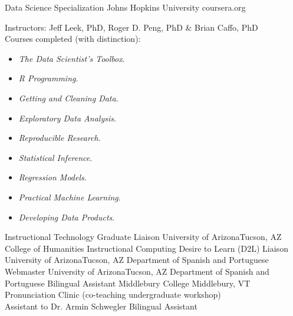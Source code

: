 \documentclass[11pt,letterpaper]{moderncv}
\begin{document}
        {Data Science Specialization}
        {Johns Hopkins University}
        {coursera.org}
        {}
        {Instructors: Jeff Leek, PhD, Roger D. Peng, PhD \& Brian Caffo, PhD\\
        Courses completed (with distinction):
        \begin{itemize}
          \item[] \small \emph{The Data Scientist’s Toolbox}.\vspace{-.03in}
          \item[] \small \emph{R Programming}.\vspace{-.03in}
          \item[] \small \emph{Getting and Cleaning Data}.\vspace{-.03in}
          \item[] \small \emph{Exploratory Data Analysis}.\vspace{-.03in}
          \item[] \small \emph{Reproducible Research}.\vspace{-.03in}
          \item[] \small \emph{Statistical Inference}.\vspace{-.03in}
          \item[] \small \emph{Regression Models}.\vspace{-.03in}
          \item[] \small \emph{Practical Machine Learning}.\vspace{-.03in}
          \item[] \small \emph{Developing Data Products}.
        \end{itemize}}
        {}
        {Instructional Technology Graduate Liaison}
        {University of Arizona}{Tucson, AZ}
        {}
        {College of Humanities Instructional Computing}
        {}
        {}
        {Desire to Learn (D2L) Liaison}
        {University of Arizona}{Tucson, AZ}
        {}
        {Department of Spanish and Portuguese}
        {}
        {}
        {Webmaster}
        {University of Arizona}{Tucson, AZ}
        {}
        {Department of Spanish and Portuguese}
        {}
        {}
        {Bilingual Assistant}
        {Middlebury College}
        {Middlebury, VT}
        {}
        {Pronunciation Clinic (co-teaching undergraduate workshop) \\ Assistant to Dr. Armin Schwegler}
        {Bilingual Assistant}
\end{document}
